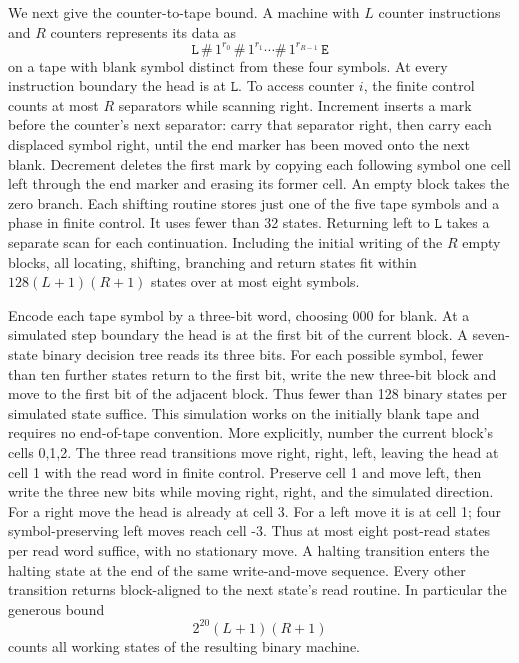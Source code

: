 We next give the counter-to-tape bound. A machine with $L$
counter instructions and $R$ counters represents its data as
\[
 \mathtt{L}\,\mathtt{\#}\,1^{r_0}\,
 \mathtt{\#}\,1^{r_1}\cdots
 \mathtt{\#}\,1^{r_{R-1}}\,\mathtt{E}
\]
on a tape with blank symbol distinct from these four symbols.
At every instruction boundary the head is at $\mathtt{L}$.
To access counter $i$, the finite control counts at most $R$
separators while scanning right. Increment inserts a mark before
the counter's next separator: carry that separator right, then
carry each displaced symbol right, until the end marker has been
moved onto the next blank. Decrement deletes the first mark by
copying each following symbol one cell left through the end marker
and erasing its former cell. An empty block takes the zero branch.
Each shifting routine stores just one of the five tape symbols
and a phase in finite control. It uses fewer than 32 states.
Returning left to $\mathtt{L}$ takes a separate scan for each
continuation. Including the initial writing of the $R$ empty
blocks, all locating, shifting, branching and return states fit
within $128(L+1)(R+1)$ states over at most eight symbols.

Encode each tape symbol by a three-bit word, choosing 000 for
blank. At a simulated step boundary the head is at the first bit
of the current block. A seven-state binary decision tree reads
its three bits. For each possible symbol, fewer than ten further
states return to the first bit, write the new three-bit block and
move to the first bit of the adjacent block. Thus fewer than 128
binary states per simulated state suffice. This simulation works
on the initially blank tape and requires no end-of-tape convention.
More explicitly, number the current block's cells 0,1,2. The
three read transitions move right, right, left, leaving the head
at cell 1 with the read word in finite control. Preserve cell 1
and move left, then write the three new bits while moving right,
right, and the simulated direction. For a right move the head is
already at cell 3. For a left move it is at cell 1; four
symbol-preserving left moves reach cell -3. Thus at most eight
post-read states per read word suffice, with no stationary move.
A halting transition enters the halting state at the end of the
same write-and-move sequence. Every other transition returns
block-aligned to the next state's read routine.
In particular the generous bound
\[
                    2^{20}(L+1)(R+1)
\]
counts all working states of the resulting binary machine.

